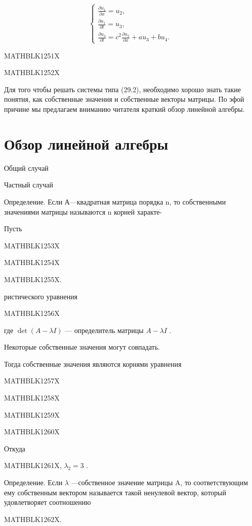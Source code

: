 \documentclass[
]{article}
\begin{document}
\[
\begin{cases} \frac{\partial u_1}{\partial x} = u_2, \\ \frac{\partial a_1}{\partial t} = u_3, \\ \frac{\partial u_3}{\partial t} = c^2 \frac{\partial u_2}{\partial x} + au_3 + bu_4. \end{cases}
\]

MATHBLK1251X

MATHBLK1252X

Для того чтобы решать системы типа (29.2), необходимо хорошо знать такие
понятия, как собственные значения и собственные векторы матрицы. По эфой
причине мы предлагаем вниманию читателя краткий обзор линейной алгебры.

\section{Обзор линейной
алгебры}\label{ux43eux431ux437ux43eux440-ux43bux438ux43dux435ux439ux43dux43eux439-ux430ux43bux433ux435ux431ux440ux44b}

Общий случай

Частный случай

Определение. Если А---квадратная матрица порядка n, то собственными
значениями матрицы называются n корней характе-

Пусть

MATHBLK1253X

MATHBLK1254X

MATHBLK1255X.

ристического уравнения

MATHBLK1256X

где \(\det(A-\lambda I)\) --- определитель матрицы \(A-\lambda I\) .

Некоторые собственные значения могут совпадать.

Тогда собственные значения являются корнями уравнения

MATHBLK1257X

MATHBLK1258X

MATHBLK1259X

MATHBLK1260X

Откуда

MATHBLK1261X, \(\lambda_2 = 3\) .

Определение. Если \(\lambda\) ---собственное значение матрицы A, то
соответствующим ему собственным вектором называется такой ненулевой
вектор, который удовлетворяет соотношению

MATHBLK1262X.
\end{document}
